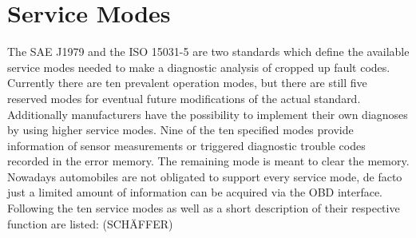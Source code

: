 \section{Service Modes}
The SAE J1979 and the ISO 15031-5 are two standards which define the available service modes needed to make a diagnostic analysis of cropped up fault codes. Currently there are ten prevalent operation modes, but there are still five reserved modes for eventual future modifications of the actual standard. Additionally manufacturers have the possibility to implement their own diagnoses by using higher service modes.
Nine of the ten specified modes provide information of sensor measurements or triggered diagnostic trouble codes recorded in the error memory. The remaining mode is meant to clear the memory. Nowadays automobiles are not obligated to support every service  mode, de facto just a limited amount of information can be acquired via the OBD interface.
Following the ten service modes as well as a short description of their respective function are listed: (SCHÄFFER)
